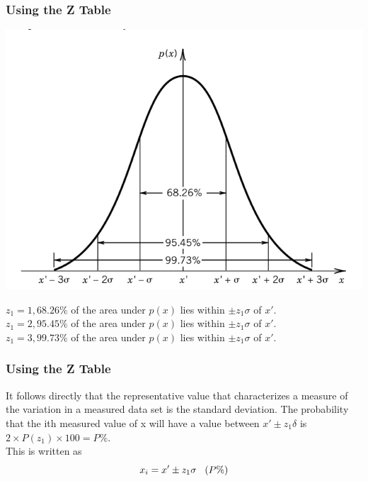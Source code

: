 \documentclass[fleqn]{beamer} %
\newcommand{\sectionIIsubsectionIIItitle}{Using the Z Table}
\begin{document}
			\begin{frame}
				\frametitle{\sectionIIsubsectionIIItitle}

				\bigskip


				\includegraphics[scale=.250]{images/topic2_fig4.png}
				
				$ z_1=1, 68.26\% $ of the area under $ p(x) $ lies within $ \pm z_1\sigma $ of $ x' $.\\ 
				$ z_1=2, 95.45\% $ of the area under $ p(x) $ lies within $ \pm z_1\sigma $ of $ x' $.\\ 
				$ z_1=3, 99.73\% $ of the area under $ p(x) $ lies within $ \pm z_1\sigma $ of $ x' $.\\ 		


			\end{frame}

			\begin{frame}
				\frametitle{\sectionIIsubsectionIIItitle}
						It follows directly that the representative value that characterizes a measure of the variation in a
				measured data set is the standard deviation. The probability that the ith measured value of x will
				have a value between $x' \pm z_1 \delta$ is $2 \times P(z_1) \times 100 = P\%$. \\

					This is written as \\
					
						\[ x_i = x' \pm z_1\sigma \hspace{3mm} (P\%) \]        
						
			

			\end{frame}
\end{document}
